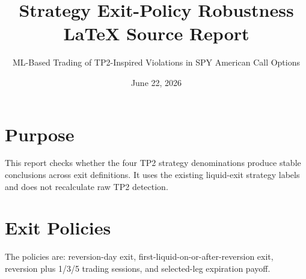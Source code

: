 \documentclass[11pt]{article}
\title{Strategy Exit-Policy Robustness\\\large LaTeX Source Report}
\author{ML-Based Trading of TP2-Inspired Violations in SPY American Call Options}
\date{June 22, 2026}
\begin{document}
\maketitle

\section{Purpose}

This report checks whether the four TP2 strategy denominations produce stable
conclusions across exit definitions. It uses the existing liquid-exit strategy
labels and does not recalculate raw TP2 detection.

\section{Exit Policies}

The policies are: reversion-day exit, first-liquid-on-or-after-reversion exit,
reversion plus 1/3/5 trading sessions, and selected-leg expiration payoff.
\end{document}
